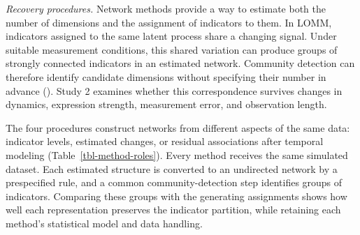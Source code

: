 \documentclass[
]{article}
\begin{document}
\begin{table}[H]

\caption{\label{tbl-scenario-words}The six Study 2 scenario families.
Numeric activity gains and dwell fractions are in Appendix B in the
supplementary material; oscillator parameters are in Table B2.}


\end{table}%

\emph{Recovery procedures.} Network methods provide a way to estimate
both the number of dimensions and the assignment of indicators to them.
In LOMM, indicators assigned to the same latent process share a changing
signal. Under suitable measurement conditions, this shared variation can
produce groups of strongly connected indicators in an estimated network.
Community detection can therefore identify candidate dimensions without
specifying their number in advance (). Study 2 examines whether this correspondence
survives changes in dynamics, expression strength, measurement error,
and observation length.

The four procedures construct networks from different aspects of the
same data: indicator levels, estimated changes, or residual associations
after temporal modeling (Table~\ref{tbl-method-roles}). Every method
receives the same simulated dataset. Each estimated structure is
converted to an undirected network by a prespecified rule, and a common
community-detection step identifies groups of indicators. Comparing
these groups with the generating assignments shows how well each
representation preserves the indicator partition, while retaining each
method's statistical model and data handling.
\end{document}
